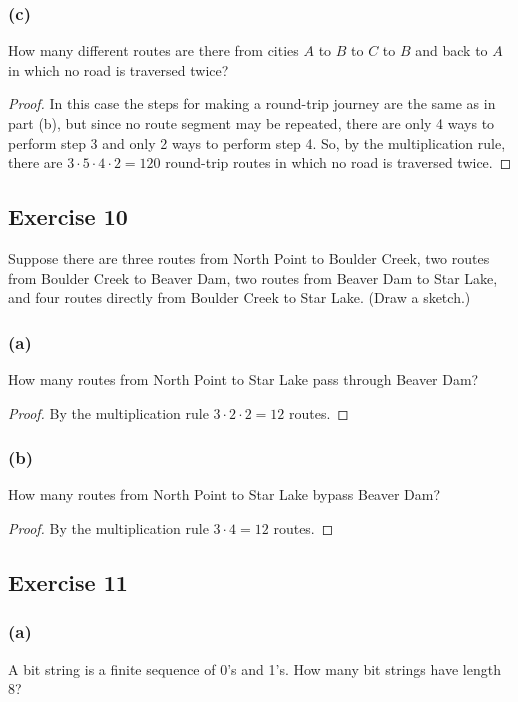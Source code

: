 \documentclass[14pt]{extarticle}
\begin{document}
\subsubsection{(c)}
How many different routes are there from cities $A$ to $B$ to $C$ to $B$ and back to $A$ in which no road is traversed twice?

\begin{proof}
     In this case the steps for making a round-trip journey are the same as in part (b), but since no route segment may be
     repeated, there are only 4 ways to perform step 3 and only 2 ways to perform step 4. So, by the multiplication rule,
     there are \(3 \cdot 5 \cdot 4 \cdot 2 = 120\) round-trip routes in which no road is traversed twice.
\end{proof}

\subsection{Exercise 10}
Suppose there are three routes from North Point to Boulder Creek, two routes from Boulder Creek to Beaver Dam, two
routes from Beaver Dam to Star Lake, and four routes directly from Boulder Creek to Star Lake. (Draw a sketch.)

\subsubsection{(a)}
How many routes from North Point to Star Lake pass through Beaver Dam?

\begin{proof}
     By the multiplication rule \(3 \cdot 2 \cdot 2 = 12\) routes.
\end{proof}

\subsubsection{(b)}
How many routes from North Point to Star Lake bypass Beaver Dam?

\begin{proof}
     By the multiplication rule \(3 \cdot 4 = 12\) routes.
\end{proof}

\subsection{Exercise 11}
\subsubsection{(a)}
A bit string is a finite sequence of 0’s and 1’s. How many bit strings have length 8?
\end{document}
